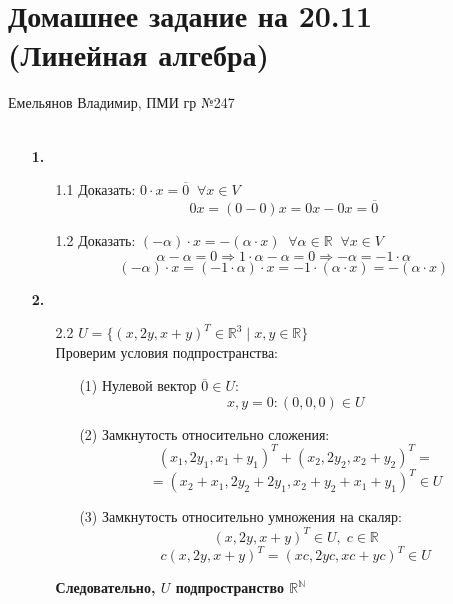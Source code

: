 \documentclass[a4paper]{article}
\renewcommand{\r}{\Rightarrow}
\newcommand{\RR}{\mathbb{R}}
\newcommand{\NN}{\mathbb{N}}
\begin{document}
\section*{Домашнее задание на 20.11 (Линейная алгебра)}
 {\large Емельянов Владимир, ПМИ гр №247}\\\\
\begin{enumerate}
    \item[\textbf{1.}]\begin{enumerate}
        \item[1.1] Доказать: $0 \cdot x = \overline{0} \;\; \forall x\in V$
        $$0x = (0-0)x= 0x-0x = \overline{0}$$

        \item[1.2] Доказать: $(-\alpha)\cdot x = - ( \alpha \cdot x) \;\; \forall \alpha \in \RR \;\; \forall x\in V$
        $$\alpha-\alpha = 0 \r 1\cdot \alpha-\alpha = 0 \r  -\alpha = -1\cdot \alpha$$
        $$(-\alpha)\cdot x =(-1 \cdot \alpha)\cdot x = -1 \cdot (\alpha\cdot x) = -(\alpha\cdot x)$$
    \end{enumerate}

    \item[\textbf{2.}]
    \begin{enumerate}
        \item[2.2] $U = \{(x,2y,x+y)^T \in \RR^3 \mid x,y \in \RR\}$\\
        Проверим условия подпространства:
        \begin{enumerate}
            \item[(1)]Нулевой вектор $\overline{0} \in U$:
            $$x, y = 0: (0, 0, 0) \in U$$
            \item[(2)]Замкнутость относительно сложения:
            $$(x_1, 2y_1, x_1+y_1)^T + (x_2, 2y_2, x_2+y_2)^T =$$
            $$= (x_2 + x_1, 2y_2 + 2y_1, x_2+y_2+x_1+y_1)^T \in U$$
            \item[(3)]Замкнутость относительно умножения на скаляр:
            $$(x, 2y, x+y)^T \in U, \; c \in \RR$$
            $$c(x, 2y, x+y)^T = (xc, 2yc, xc+yc)^T \in U$$
        \end{enumerate}
        \textbf{Следовательно, $U$ подпространство $\RR^\NN$}\\


\end{enumerate}
\end{enumerate}
\end{document}

